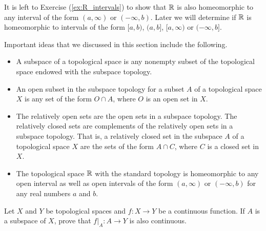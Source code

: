 It is left to Exercise (\ref{ex:R_intervals}) to show that $\mathbb{R}$ is also homeomorphic to any interval of the form $(a,\infty)$ or $(-\infty,b)$. Later we will determine if $\mathbb{R}$ is homeomorphic to intervals of the form $[a,b)$, $(a,b]$, $[a, \infty)$ or $(-\infty, b]$. 


\label{sec_sub_summ}
Important ideas that we discussed in this section include the following.
\begin{itemize}
\item A subspace of a topological space is any nonempty subset of the topological space endowed with the subspace topology. 
\item An open subset in the subspace topology for a subset $A$ of a topological space $X$ is any set of the form $O \cap A$, where $O$ is an open set in $X$. 
\item The relatively open sets are the open sets in a subspace topology. The relatively closed sets are complements of the relatively open sets in a subspace topology. That is, a relatively closed set in the subspace $A$ of a topological space $X$ are the sets of the form $A \cap C$, where $C$ is a closed set in $X$.  
\item The topological space $\mathbb{R}$ with the standard topology is homeomorphic to any open interval as well as open intervals of the form $(a,\infty)$ or $(-\infty,b)$ for any real numbers $a$ and $b$. 
\end{itemize}

\label{sec_sub_exer}

\be


\item Let $X$ and $Y$ be topological spaces and $f: X \to Y$ be a continuous function. If $A$ is a subspace of $X$, prove that $f|_A : A \to Y$ is also continuous.

\begin{comment}

\ExerciseSolution Let $A$ be a subspace of $X$. To show that $f|_A$ is continuous, let $O$ be an open subset of $Y$. Then $f^{-1}(O)$ is open in $X$. So $f^{-1}(O) \cap A$ is open in $A$. We will demonstrate that $f^{-1}(O) \cap A = (f|_A)^{-1}(O)$, which will show that $f|_A$ is continuous. 

Let $x \in f^{-1}(O) \cap A$. Then $x \in f^{-1}(O)$ and $x \in A$. Since $f(x) \in O$ and $x \in A$, it follows that $f|_A(x) \in O$ and $x \in (f|_A)^{-1}(O)$. So $f^{-1}(O) \cap A \subseteq (f|_A)^{-1}(O)$.

Now let $x \in (f|_A)^{-1}(O)$. Then $x$ must be in $A$ and $f|_A(x) \in O$. So $f(x) \in O$ and $x \in f^{-1}(O) \cap A$. We conclude that $(f|_A)^{-1}(O) \subseteq f^{-1}(O) \cap A$ and, consequently, that $f^{-1}(O) \cap A = (f|_A)^{-1}(O)$.

\end{comment}


